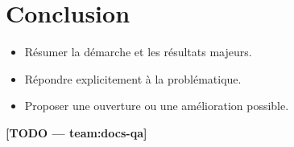 \section{Conclusion}
\begin{itemize}
  \item Résumer la démarche et les résultats majeurs.
  \item Répondre explicitement à la problématique.
  \item Proposer une ouverture ou une amélioration possible.
\end{itemize}
\textbf{[TODO — team:docs-qa]}
